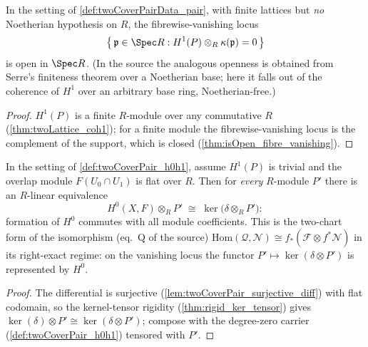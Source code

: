 \begin{theorem}
  \label{thm:twoCoverPair_isOpen_vanishing}
  \leanok
  In the setting of \ref{def:twoCoverPairData_pair}, with finite lattices but \emph{no}
  Noetherian hypothesis on \(R\), the fibrewise-vanishing locus
  \[
    \bigl\{\, \mathfrak p \in \Spec R :
      H^1(P) \otimes_R \kappa(\mathfrak p) = 0 \,\bigr\}
  \]
  is open in \(\Spec R\). (In the source the analogous openness is obtained from
  Serre's finiteness theorem over a Noetherian base; here it falls out of the coherence
  of \(H^1\) over an arbitrary base ring, Noetherian-free.)
\end{theorem}
\begin{proof}
  \leanok
  \(H^1(P)\) is a finite \(R\)-module over any commutative \(R\)
  (\ref{thm:twoLattice_coh1}); for a finite module the fibrewise-vanishing locus is the
  complement of the support, which is closed (\ref{thm:isOpen_fibre_vanishing}).
\end{proof}

\begin{definition}
  \label{def:twoCoverPair_h0TensorEquiv}
  \leanok
  In the setting of \ref{def:twoCoverPair_h0h1}, assume \(H^1(P)\) is trivial and the
  overlap module \(F(U_0 \cap U_1)\) is flat over \(R\). Then for \emph{every}
  \(R\)-module \(P'\) there is an \(R\)-linear equivalence
  \[
    H^0(X, F) \otimes_R P' \;\cong\;
      \ker\bigl(\delta \otimes_R P'\bigr) :
  \]
  formation of \(H^0\) commutes with all module coefficients. This is the two-chart
  form of the isomorphism (eq.\ Q of the source)
  \(\mathrm{Hom}(\mathcal Q, \mathcal N) \cong f_*(\mathcal F \otimes f^*\mathcal N)\)
  in its right-exact regime: on the vanishing locus the functor
  \(P' \mapsto \ker(\delta \otimes P')\) is represented by \(H^0\).
\end{definition}
\begin{proof}
  \leanok
  The differential is surjective (\ref{lem:twoCoverPair_surjective_diff}) with flat
  codomain, so the kernel-tensor rigidity (\ref{thm:rigid_ker_tensor}) gives
  \(\ker(\delta) \otimes P' \cong \ker(\delta \otimes P')\); compose with the
  degree-zero carrier (\ref{def:twoCoverPair_h0h1}) tensored with \(P'\).
\end{proof}

